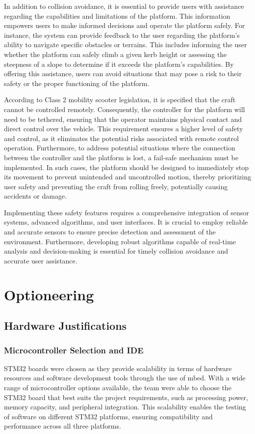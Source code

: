 \documentclass [12pt]{article}
\begin{document}
In addition to collision avoidance, it is essential to provide users with assistance regarding the capabilities and limitations of the platform. This information empowers users to make informed decisions and operate the platform safely. For instance, the system can provide feedback to the user regarding the platform's ability to navigate specific obstacles or terrains. This includes informing the user whether the platform can safely climb a given kerb height or assessing the steepness of a slope to determine if it exceeds the platform's capabilities. By offering this assistance, users can avoid situations that may pose a risk to their safety or the proper functioning of the platform.

According to Class 2 mobility scooter legislation, it is specified that the craft cannot be controlled remotely. Consequently, the controller for the platform will need to be tethered, ensuring that the operator maintains physical contact and direct control over the vehicle. This requirement ensures a higher level of safety and control, as it eliminates the potential risks associated with remote control operation. Furthermore, to address potential situations where the connection between the controller and the platform is lost, a fail-safe mechanism must be implemented. In such cases, the platform should be designed to immediately stop its movement to prevent unintended and uncontrolled motion, thereby prioritizing user safety and preventing the craft from rolling freely, potentially causing accidents or damage.

Implementing these safety features requires a comprehensive integration of sensor systems, advanced algorithms, and user interfaces. It is crucial to employ reliable and accurate sensors to ensure precise detection and assessment of the environment. Furthermore, developing robust algorithms capable of real-time analysis and decision-making is essential for timely collision avoidance and accurate user assistance.


\newpage
\section{Optioneering}

\subsection{Hardware Justifications}

\subsubsection{Microcontroller Selection and IDE}
STM32 boards were chosen as they provide scalability in terms of hardware resources and software development tools through the use of mbed. With a wide range of microcontroller options available, the team were able to choose the STM32 board that best suits the project requirements, such as processing power, memory capacity, and peripheral integration. This scalability enables the testing of software on different STM32 platforms, ensuring compatibility and performance across all three platforms.
\end{document}
